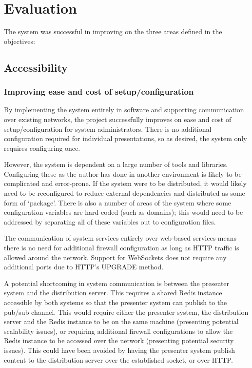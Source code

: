 \documentclass[a4papert,11pt,notitlepage]{article}
\begin{document}
\pagebreak
\section{Evaluation}
The system was successful in improving on the three areas defined in the objectives:

\subsection{Accessibility}
\subsubsection{Improving ease and cost of setup/configuration}
By implementing the system entirely in software and supporting communication over existing networks, the project successfully improves on ease and cost of setup/configuration for system administrators. There is no additional configuration required for individual presentations, so as desired, the system only requires configuring once.

However, the system is dependent on a large number of tools and libraries. Configuring these as the author has done in another environment is likely to be complicated and error-prone. If the system were to be distributed, it would likely need to be reconfigured to reduce external dependencies and distributed as some form of `package'. There is also a number of areas of the system where some configuration variables are hard-coded (such as domains); this would need to be addressed by separating all of these variables out to configuration files.

The communication of system services entirely over web-based services means there is no need for additional firewall configuration as long as HTTP traffic is allowed around the network. Support for WebSockets does not require any additional ports due to HTTP's UPGRADE method. 

A potential shortcoming in system communication is between the presenter system and the distribution server. This requires a shared Redis instance accessible by both systems so that the presenter system can publish to the pub/sub channel. This would require either the presenter system, the distribution server and the Redis instance to be on the same machine (presenting potential scalability issues), or requiring additional firewall configurations to allow the Redis instance to be accessed over the network (presenting potential security issues). This could have been avoided by having the presenter system publish content to the distribution server over the established socket, or over HTTP.
\end{document}
